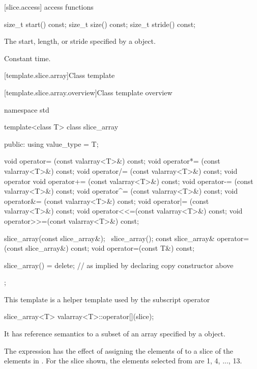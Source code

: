 [slice.access]{ access functions}
%
%
%
\begin{itemdecl}
size_t start() const;
size_t size() const;
size_t stride() const;
\end{itemdecl}

\begin{itemdescr}
\pnum
\returns The start, length, or stride specified
by a  object.

\pnum
\complexity Constant time.
\end{itemdescr}

[template.slice.array]{Class template }

[template.slice.array.overview]{Class template  overview}

%
%
\begin{codeblock}
namespace std {
  template<class T> class slice_array {
  public:
    using value_type = T;

    void operator=  (const valarray<T>&) const;
    void operator*= (const valarray<T>&) const;
    void operator/= (const valarray<T>&) const;
    void operator%
    void operator+= (const valarray<T>&) const;
    void operator-= (const valarray<T>&) const;
    void operator^= (const valarray<T>&) const;
    void operator&= (const valarray<T>&) const;
    void operator|= (const valarray<T>&) const;
    void operator<<=(const valarray<T>&) const;
    void operator>>=(const valarray<T>&) const;

    slice_array(const slice_array&);
    ~slice_array();
    const slice_array& operator=(const slice_array&) const;
    void operator=(const T&) const;

    slice_array() = delete;       // as implied by declaring copy constructor above
  };
}
\end{codeblock}

\pnum
This template is a helper template used by the
 subscript operator
\begin{codeblock}
slice_array<T> valarray<T>::operator[](slice);
\end{codeblock}

\pnum
It has reference semantics to a subset of an array specified by a
object.
\begin{example}
The expression
has the effect of assigning the elements of
to a slice of the elements in
.
For the slice shown, the elements
selected from
are 1, 4, ..., 13.
\end{example}

